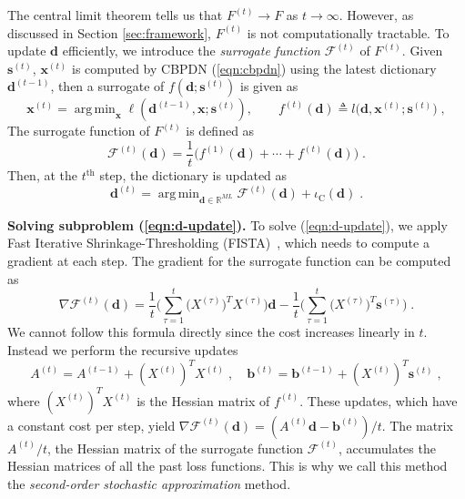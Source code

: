 \documentclass[final]{siamart1116}
\newcommand{\mb}[1]{\mathbf{#1}}
\DeclareMathOperator*{\argmin}{arg\,min}
\def \R  {\mathbb{R}}
\def \F  {\mathcal{F}}
\begin{document}
The central limit theorem tells us that $F^{(t)}\to F$ as $t\to\infty$. However, as discussed in Section \ref{sec:framework}, $F^{(t)}$ is not computationally tractable. To update $\mb{d}$ efficiently, we introduce the \emph{surrogate function} $\F^{(t)}$ of $F^{(t)}$.  Given $\mb{s}^{(t)}$, $\mb{x}^{(t)}$ is computed by CBPDN (\ref{eqn:cbpdn}) using the latest dictionary $\mb{d}^{(t-1)}$, then a surrogate of $f(\mb{d};\mb{s}^{(t)})$ is given as
\begin{equation}
\label{eqn:loss_surrogate}
\mb{x}^{(t)} = \argmin_{\mb{x}} \ell(\mb{d}^{(t-1)},\mb{x};\mb{s}^{(t)}), \qquad f^{(t)}(\mb{d})\triangleq l\Big(\mb{d}, \mb{x}^{(t)}; \mb{s}^{(t)}\Big) \;,
\end{equation}
The surrogate function of $F^{(t)}$ is defined as
\begin{equation}
\label{eqn:surrogate}
\F^{(t)}(\mb{d}) = \frac{1}{t}\Big(f^{(1)}(\mb{d}) + \cdots + f^{(t)}(\mb{d}) \Big)\;.
\end{equation}
Then, at the $t^{\text{th}}$ step, the dictionary is updated as
\begin{equation}
\label{eqn:d-update}
\mb{d}^{(t)} = \argmin_{\mb{d}\in\R^{ML}} \F^{(t)}(\mb{d}) + \iota_{\mathrm{C}}(\mb{d})  \;.
\end{equation}

\textbf{Solving subproblem (\ref{eqn:d-update}).}\label{para:fista} To solve (\ref{eqn:d-update}), we apply Fast Iterative Shrinkage-Thresholding
(FISTA)~\cite{beck2009fast}, which needs to compute a gradient at each step. The gradient for the surrogate function can be computed as
\[
\nabla \F^{(t)}(\mb{d}) = \frac{1}{t} \Big(\sum_{\tau=1}^t  \big(X^{(\tau)}\big)^T X^{(\tau)}\Big) \mb{d} - \frac{1}{t}\Big(\sum_{\tau=1}^t  \big(X^{(\tau)}\big)^T \mb{s}^{(\tau)}\Big) \;.
\]
We cannot follow this formula directly since the cost increases linearly in $t$.
Instead we perform the recursive updates
\begin{equation}
\label{eqn:A}
A^{(t)} = A^{(t-1)} + (X^{(t)})^T X^{(t)} \;, \quad \mb{b}^{(t)} = \mb{b}^{(t-1)} + (X^{(t)})^T \mb{s}^{(t)} \;,
\end{equation}
where $(X^{(t)})^T X^{(t)}$ is the Hessian matrix of $f^{(t)}$. These updates, which have a constant cost per step, yield $\nabla \F^{(t)}(\mb{d}) = (A^{(t)}\mb{d} - \mb{b}^{(t)})/t$. The matrix $A^{(t)}/t$, the Hessian matrix of the surrogate function $\F^{(t)}$, accumulates the Hessian matrices of all the past loss functions. This is why we call this method the \emph{second-order stochastic approximation} method.
\end{document}
